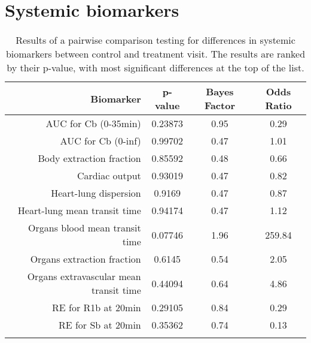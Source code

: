 \documentclass{epflreport}%
\begin{document}
\section{Systemic biomarkers}%
\label{sec:Systemicbiomarkers}%

%
\begin{longtable}{rccc}%
\hline%
Biomarker&p{-}value&Bayes Factor&Odds Ratio\\%
\hline%
AUC for Cb (0{-}35min)&0.23873&0.95&0.29\\%
AUC for Cb (0{-}inf)&0.99702&0.47&1.01\\%
Body extraction fraction&0.85592&0.48&0.66\\%
Cardiac output&0.93019&0.47&0.82\\%
Heart{-}lung dispersion&0.9169&0.47&0.87\\%
Heart{-}lung mean transit time&0.94174&0.47&1.12\\%
Organs blood mean transit time&0.07746&1.96&259.84\\%
Organs extraction fraction&0.6145&0.54&2.05\\%
Organs extravascular mean transit time&0.44094&0.64&4.86\\%
RE for R1b at 20min&0.29105&0.84&0.29\\%
RE for Sb at 20min&0.35362&0.74&0.13\\%
\hline%
\caption{Results of a pairwise comparison testing for differences in systemic biomarkers between control and treatment visit. The results are ranked by their p-value, with most significant differences at the top of the list.} \\%
\end{longtable}%
\end{document}
